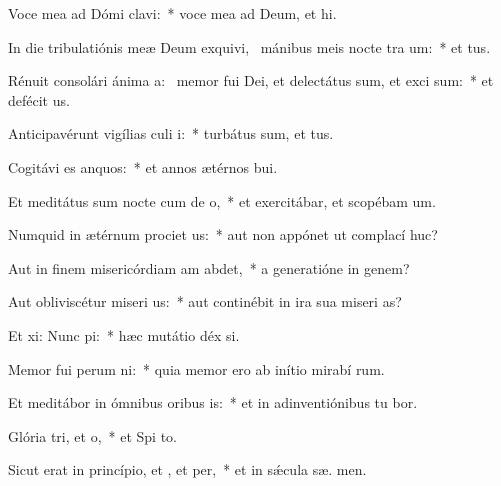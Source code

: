 \item Voce mea ad Dómi clavi:~* voce mea ad Deum, et  hi.
\item In die tribulatiónis meæ Deum exquivi,~\pscross{} mánibus meis nocte tra um:~* et   tus.
\item Rénuit consolári ánima a:~\pscross{} memor fui Dei, et delectátus sum, et exci sum:~* et defécit  us.
\item Anticipavérunt vigílias culi i:~* turbátus sum, et   tus.
\item Cogitávi es anquos:~* et annos ætérnos   bui.
\item Et meditátus sum nocte cum de o,~* et exercitábar, et scopébam  um.
\item Numquid in ætérnum prociet us:~* aut non appónet ut complací  huc?
\item Aut in finem misericórdiam am abdet,~* a generatióne in genem?
\item Aut obliviscétur miseri us:~* aut continébit in ira sua miseri as?
\item Et xi: Nunc pi:~* hæc mutátio déx si.
\item Memor fui perum ni:~* quia memor ero ab inítio mirabí rum.
\item Et meditábor in ómnibus oribus is:~* et in adinventiónibus tu bor.
\item Glória tri, et o,~* et Spi to.
\item Sicut erat in princípio, et , et per,~* et in sǽcula sæ. men.
